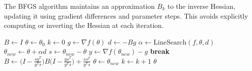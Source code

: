   \begin{algo}[BFGS]
    The BFGS algorithm maintains an approximation $B_k$ to the inverse Hessian, updating it using gradient differences and parameter steps. This avoids explicitly computing or inverting the Hessian at each iteration. 
    \begin{algorithm}[H]
    \label{alg:bfgs}
    \begin{algorithmic}[1]

        \State $B \gets I$ 
        \State $\theta \gets \theta_0$
        \State $k \gets 0$
          \State $g \gets \nabla f(\theta)$
          \State $d \gets -B g$
          \State $\alpha \gets \text{LineSearch}(f, \theta, d)$ 
          \State $\theta_{new} \gets \theta + \alpha d$
          \State $s \gets \theta_{new} - \theta$
          \State $y \gets \nabla f(\theta_{new}) - g$
            \State \textbf{break} 
          \EndIf
          \State $B \gets \Big(I - \frac{s y^T}{y^T s}\Big) B \Big(I - \frac{y s^T}{y^T s}\Big) + \frac{s s^T}{y^T s}$
          \State $\theta \gets \theta_{new}$
          \State $k \gets k + 1$
        \EndWhile
        \State \Return $\theta$
      \EndProcedure
    \end{algorithmic}
    \end{algorithm}
  \end{algo}

